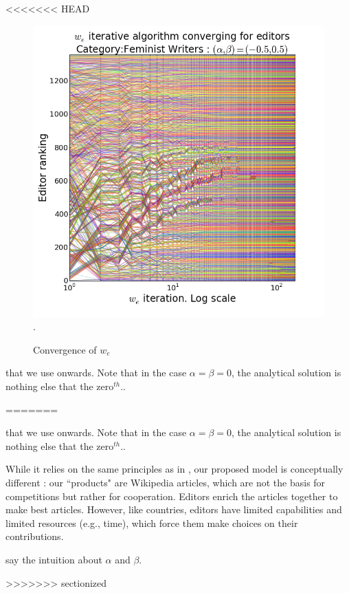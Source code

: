 <<<<<<< HEAD
\begin{figure}[!t]
\centering
\includegraphics[width=0.9\columnwidth]{Figures/fem_editors_iter_converge.png}.
\caption{Convergence of $w_e$}
\label{fig:convergence}
\end{figure}

that we use onwards. Note that in the case $\alpha = \beta = 0$, the analytical solution is nothing else that the zero$^{th}$..

=======



that we use onwards. Note that in the case $\alpha = \beta = 0$, the analytical solution is nothing else that the zero$^{th}$..

While it relies on the same principles as in \cite{caldarelli2012network}, our proposed model is conceptually different : our ``products" are Wikipedia articles, which are not the basis for competitions but rather for cooperation. Editors enrich the articles together to make best articles. However, like countries, editors have limited capabilities and limited resources (e.g., time), which force them make choices on their contributions.


say the intuition about $\alpha$ and $\beta$.

>>>>>>> sectionized
